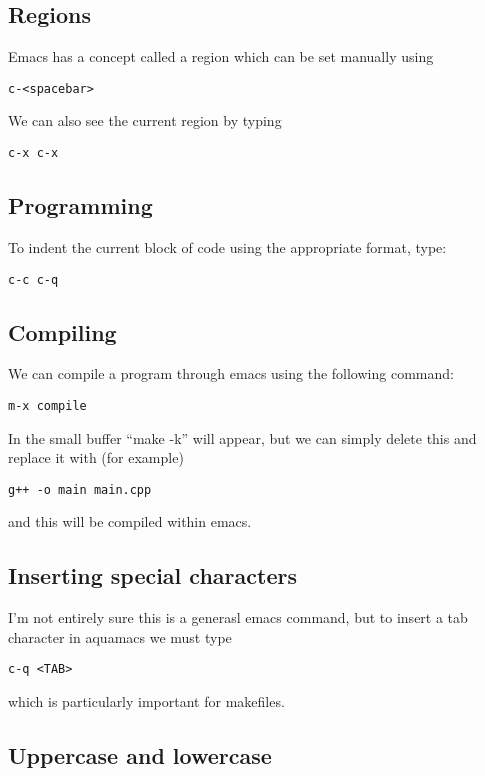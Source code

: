 \documentclass[a4paper, 10pt]{article}
\begin{document}
\subsection*{Regions}
\label{sec:regions}

Emacs has a concept called a region which can be set manually using 
\begin{verbatim}
c-<spacebar>
\end{verbatim}

We can also see the current region by typing
\begin{verbatim}
c-x c-x
\end{verbatim}


\subsection*{Programming}

To indent the current block of code using the appropriate format, type:
\begin{verbatim}
c-c c-q
 \end{verbatim}
 
 
\subsection*{Compiling}

We can compile a program through emacs using the following command:
\begin{verbatim}
m-x compile
 \end{verbatim}
In the small buffer ``make -k'' will appear, but we can simply delete this and replace it with (for example) 
\begin{verbatim}
g++ -o main main.cpp
 \end{verbatim}
and this will be compiled within emacs.
 
\subsection*{Inserting special characters}

I'm not entirely sure this is a generasl emacs command, but to insert a tab character in aquamacs we must type
\begin{verbatim}
c-q <TAB>
 \end{verbatim}
which is particularly important for makefiles.  

\subsection*{Uppercase and lowercase}
\label{sec:uppercase-lowercase}
\end{document}
